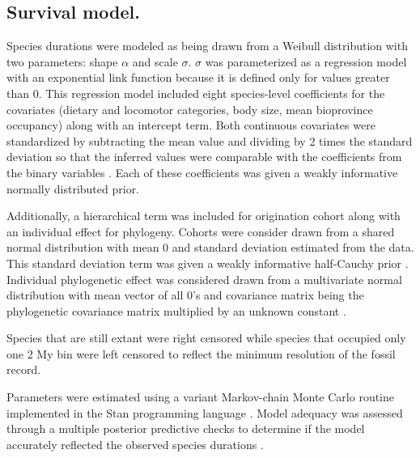 \documentclass{nature}
\begin{document}
\begin{methods}
  \subsection{Survival model.}

  Species durations were modeled as being drawn from a Weibull distribution with two parameters: shape \(\alpha\) and scale \(\sigma\). \(\sigma\) was parameterized as a regression model with an exponential link function because it is defined only for values greater than 0. This regression model included eight species-level coefficients for the covariates (dietary and locomotor categories, body size, mean bioprovince occupancy) along with an intercept term. Both continuous covariates were standardized by subtracting the mean value and dividing by 2 times the standard deviation so that the inferred values were comparable with the coefficients from the binary variables \cite{Gelman2007}. Each of these coefficients was given a weakly informative normally distributed prior.
  
  Additionally, a hierarchical term was included for origination cohort along with an individual effect for phylogeny. Cohorts were consider drawn from a shared normal distribution with mean 0 and standard deviation estimated from the data. This standard deviation term was given a weakly informative half-Cauchy prior \cite{Gelman2013d}. Individual phylogenetic effect was considered drawn from a multivariate normal distribution with mean vector of all 0's and covariance matrix being the phylogenetic covariance matrix multiplied by an unknown constant \cite{Lynch1991,Housworth2004}.

  Species that are still extant were right censored while species that occupied only one 2 My bin were left censored to reflect the minimum resolution of the fossil record.

  Parameters were estimated using a variant Markov-chain Monte Carlo routine implemented in the Stan programming language \cite{2014stan}. Model adequacy was assessed through a multiple posterior predictive checks to determine if the model accurately reflected the observed species durations \cite{Gelman2013d}. 




\end{methods}
\end{document}
